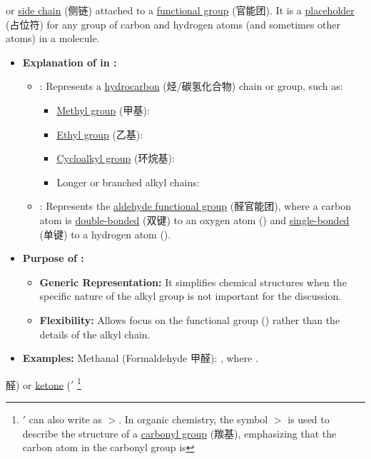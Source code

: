 \begin{itemize}
{    or \underline{side chain} (侧链) attached to a \underline{functional group} \footnotemark[9] (官能团). It is a
    \underline{placeholder} (占位符) for any group of carbon and hydrogen atoms (and sometimes other atoms) in a molecule.
    \begin{itemize}
        \item \textbf{Explanation of  in :}
        \begin{itemize}
            \item {}: Represents a \underline{hydrocarbon} (烃/碳氢化合物) chain or group, such as:
            \begin{itemize}
                \item \underline{Methyl group} (甲基): 
                \item \underline{Ethyl group} (乙基): 
                \item \underline{Cycloalkyl group} (环烷基): 
                \item Longer or branched alkyl chains: 
            \end{itemize}
            \item {}: Represents the \underline{aldehyde functional group} (醛官能团), where a carbon atom is
            \underline{double-bonded} (双键) to an oxygen atom () and \underline{single-bonded} (单键) to a hydrogen atom
            ().
        \end{itemize}
        \item \textbf{Purpose of :}
        \begin{itemize}
            \item[1.] \textbf{Generic Representation:} It simplifies chemical structures when the specific nature of the alkyl
            group is not important for the discussion.
            \item[2.] \textbf{Flexibility:} Allows focus on the functional group () rather than the details of the alkyl
            chain.
        \end{itemize}
        \item \textbf{Examples:} Methanal (Formaldehyde 甲醛): , where .
    \end{itemize}} 醛) or
    \underline{ketone} ($'$ \footnote{$'$ can also write as $>$. In organic chemistry, the symbol $>$ is used
    to describe the structure of a \underline{carbonyl group} (羰基), emphasizing that the carbon atom in the carbonyl group is
}
\end{itemize}
